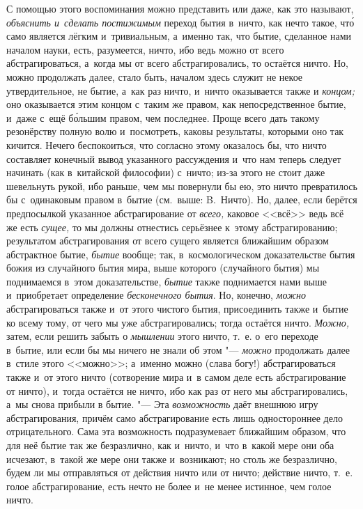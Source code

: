 С помощью этого воспоминания можно представить или даже, как это называют,
{\em объяснить и~сделать постижимым} переход бытия в~ничто, как нечто такое,
чт\'{о} само является лёгким и~тривиальным, а~именно так, что бытие, сделанное
нами началом науки, есть, разумеется, ничто, ибо ведь можно от всего
абстрагироваться, а~когда мы от всего абстрагировались, то остаётся ничто. Но,
можно продолжать далее, стало быть, началом здесь служит не некое
утвердительное, не бытие, а~как раз ничто, и~ничто оказывается также и
{\em концом;} оно оказывается этим концом с~таким же правом, как
непосредственное бытие, и~даже с~ещё б\'{о}льшим правом, чем последнее. Проще
всего дать такому резонёрству полную волю и~посмотреть,
каковы результаты, которыми оно так кичится. Нечего
беспокоиться, что согласно этому оказалось бы, что ничто составляет конечный
вывод указанного рассуждения и~что нам теперь следует начинать (как в~китайской
философии) с~ничто; из-за этого не стоит даже шевельнуть рукой, ибо раньше, чем
мы повернули бы ею, это ничто превратилось бы с~одинаковым правом в~бытие
(см.~выше: B.~Ничто). Но, далее, если берётся предпосылкой указанное
абстрагирование от {\em всего,} каковое <<всё>> ведь всё же есть {\em сущее,}
то мы должны отнестись серьёзнее к~этому абстрагированию; результатом
абстрагирования от всего сущего является ближайшим образом абстрактное бытие,
{\em бытие} вообще; так, в~космологическом доказательстве бытия божия из
случайного бытия мира, выше которого (случайного бытия) мы поднимаемся в~этом
доказательстве, {\em бытие} также поднимается нами выше и~приобретает
определение {\em бесконечного бытия}. Но, конечно, {\em можно} абстрагироваться
также и~от этого чистого бытия, присоединить также и~бытие ко всему тому, от
чего мы уже абстрагировались; тогда остаётся ничто. {\em Можно,} затем, если
решить забыть о {\em мышлении} этого ничто, т.~е. о~его переходе в~бытие, или
если бы мы ничего не знали об этом "--- {\em можно} продолжать далее в~стиле
этого <<можно>>; а~именно можно (слава богу!) абстрагироваться также и~от этого
ничто (сотворение мира и~в самом деле есть абстрагирование от ничто), и~тогда
остаётся не ничто, ибо как раз от него мы абстрагировались, а~мы снова прибыли
в бытие. "--- Эта {\em возможность} даёт внешнюю игру абстрагирования,
причём само абстрагирование есть лишь одностороннее дело отрицательного. Сама
эта возможность подразумевает ближайшим образом, что для неё бытие так же
безразлично, как и~ничто, и~что в~какой мере они оба исчезают, в~такой же мере
они также и~возникают; но столь же безразлично, будем ли мы отправляться от
действия ничто или от ничто; действие ничто, т.~е. голое абстрагирование, есть
нечто не более и~не менее истинное, чем голое ничто.

